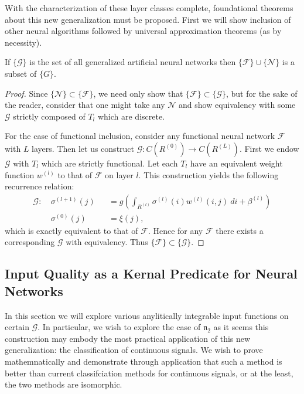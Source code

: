 With the characterization of these layer classes complete, foundational theorems about this new generalization must be proposed. First we will show inclusion of other neural algorithms followed by universal approximation theorems (as by necessity). 

\begin{theorem}
If $\{\mathcal{G}\}$ is the set of all generalized artificial neural networks then $\{\mathcal{F}\} \cup \{\mathcal{N}\}$ is a subset of $\{G\}$.
\end{theorem}
\begin{proof}
Since $\{\mathcal{N}\} \subset \{\mathcal{F}\}$, we need only show that $\{\mathcal{F}\} \subset \{\mathcal{G}\}$, but for the sake of the reader, consider that one might take any $\mathcal{N}$ and show equivalency with some $\mathcal{G}$ strictly composed of $T_l$ which are discrete.

For the case of functional inclusion, consider any functional neural network $\mathcal{F}$ with $L$ layers. Then let us construct $\mathcal{G} : C\left(R^{(0)}\right) \to C\left(R^{(L)}\right)$. First we endow $\mathcal{G}$ with $T_l$ which are strictly functional. Let each $T_l$ have an equivalent weight function $w^{(l)}$ to that of $\mathcal{F}$ on layer $l$. This construction yields the following recurrence relation:
\begin{equation}
          \begin{alignedat}{2}
        \mathcal{G}:\ &\sigma^{(l+1)}(j) & &=  g\left(\int_{R^{(l)}} \sigma^{(l)}(i) w^{(l)}(i,j)\ di + \beta^{(l)}\right)  \\
        &\sigma^{(0)}(j) & &= \xi(j), 
        \end{alignedat}
\end{equation}
which is exactly equivalent to that of $\mathcal{F}$. Hence for any $\mathcal{F}$ there exists a corresponding $\mathcal{G}$ with equivalency. Thus $\{\mathcal{F}\} \subset \{\mathcal{G}\}.$
\end{proof}



\subsection{Input Quality as a Kernal Predicate for Neural Networks}
In this section we will explore various anylitically integrable input functions on certain $\mathcal{G}$. In particular, we wish to explore the case of $\mathfrak{n}_2$ as it seems this construction may embody the most practical application of this new generalization: the classification of continuous signals. We wish to prove mathemnatically and demonstrate through application that such a method is better than current classifciation methods for continuous signals, or at the least, the two methods are isomorphic. 

